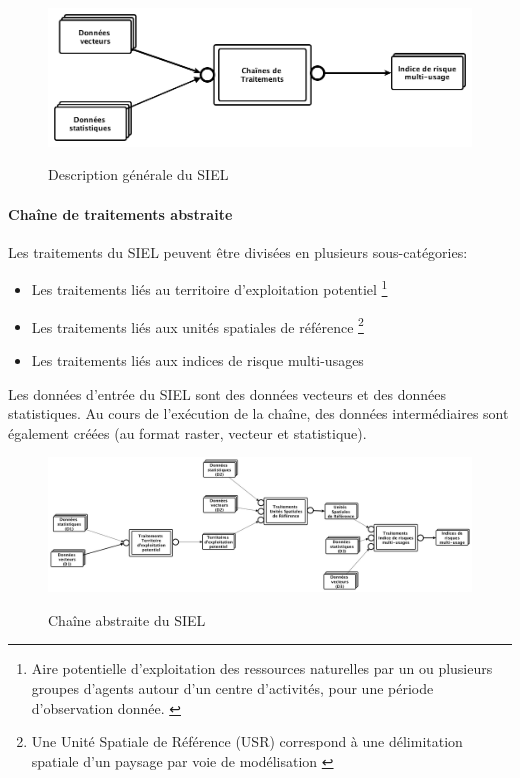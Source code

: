 \begin{center}
\begin{figure}[h] \centering
\includegraphics[width=16cm]{TraitementsSiel1.png}\\
\caption{\label{SIEL1} Description générale du SIEL}
\end{figure}
\end{center}

\paragraph{Chaîne de traitements abstraite\\}

Les traitements du SIEL peuvent être divisées en plusieurs sous-catégories: 

\begin{itemize}
\item Les traitements liés au territoire d'exploitation potentiel \footnote{Aire potentielle d’exploitation des ressources naturelles par un ou plusieurs groupes d’agents autour d’un centre d’activités, pour une période d’observation donnée. \citep{SIEL2012}}
\item Les traitements liés aux unités spatiales de référence \footnote{Une Unité Spatiale de Référence (USR) correspond à une délimitation spatiale d’un paysage par voie de modélisation \citep{SIEL2012}}
\item Les traitements liés aux indices de risque multi-usages

\end{itemize}

Les données d'entrée du SIEL sont des données vecteurs et des données statistiques. Au cours de l'exécution de la chaîne, des données intermédiaires sont également créées (au format raster, vecteur et statistique). 

\begin{center}
\begin{figure}[h] \centering
\includegraphics[width=16cm]{traitementsSiel2.png}\\
\caption{\label{SIEL2} Chaîne abstraite du SIEL}
\end{figure}
\end{center}

